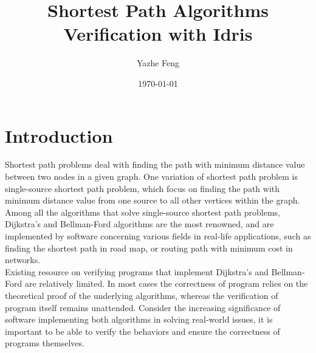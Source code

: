 \documentclass[11pt, a4paper]{article} %
\title{Shortest Path Algorithms Verification with Idris} %
\author{
Yazhe Feng %
  }
\date{\small \today} %
\theoremstyle{definition}
\begin{document}
%

\maketitle %


\setcounter{page}{1} %

\section{Introduction} %
Shortest path problems deal with finding the path with minimum distance value between two nodes in a given graph. One variation of shortest path problem is single-source shortest path problem, which focus on finding the path with minimum distance value from one source to all other vertices within the graph. Among all the algorithms that solve single-source shortest path problems, Dijkstra's and Bellman-Ford algorithms are the most renowned, and are implemented by software concerning various fields in real-life applications, such as finding the shortest path in road map, or routing path with minimum cost in networks. 
\\

Existing resource on verifying programs that implement Dijkstra's and Bellman-Ford are relatively limited. In most cases the correctness of program relies on the theoretical proof of the underlying algorithms, whereas the verification of program itself remains unattended. Consider the increasing significance of software implementing both algorithms in solving real-world issues, it is important to be able to verify the behaviors and ensure the correctness of programs themselves.
\\
\end{document}
